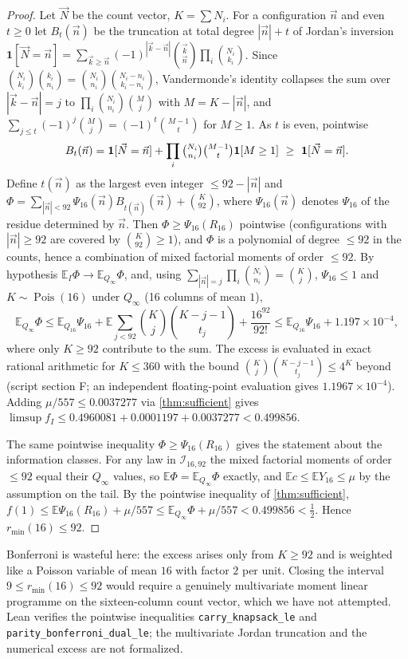 \documentclass[11pt]{article}
\DeclareMathOperator{\Pois}{Pois}
\newcommand{\Ex}{\mathbb E}
\newcommand{\Av}{\mathbb E}
\newcommand{\ind}{\mathbf 1}
\newcommand{\Qinf}{{Q_\infty}}
\begin{document}
\begin{proof}
Let $\vec N$ be the count vector, $K=\sum N_i$. For a configuration $\vec n$ and even $t\ge0$ let $B_t(\vec n)$ be the truncation at total degree $|\vec n|+t$ of Jordan's inversion $\ind[\vec N=\vec n]=\sum_{\vec k\ge\vec n}(-1)^{|\vec k-\vec n|}\binom{\vec k}{\vec n}\prod_i\binom{N_i}{k_i}$. Since $\binom{N_i}{k_i}\binom{k_i}{n_i}=\binom{N_i}{n_i}\binom{N_i-n_i}{k_i-n_i}$, Vandermonde's identity collapses the sum over $|\vec k-\vec n|=j$ to $\prod_i\binom{N_i}{n_i}\binom{M}{j}$ with $M=K-|\vec n|$, and $\sum_{j\le t}(-1)^j\binom Mj=(-1)^t\binom{M-1}t$ for $M\ge1$. As $t$ is even, pointwise
\[
B_t(\vec n)=\ind[\vec N=\vec n]+\prod_i\tbinom{N_i}{n_i}\tbinom{M-1}t\ind[M\ge1]\ \ge\ \ind[\vec N=\vec n].
\]
Define $t(\vec n)$ as the largest even integer $\le92-|\vec n|$ and $\Phi=\sum_{|\vec n|<92}\Psi_{16}(\vec n)B_{t(\vec n)}(\vec n)+\binom K{92}$, where $\Psi_{16}(\vec n)$ denotes $\Psi_{16}$ of the residue determined by $\vec n$. Then $\Phi\ge\Psi_{16}(R_{16})$ pointwise (configurations with $|\vec n|\ge92$ are covered by $\binom K{92}\ge1$), and $\Phi$ is a polynomial of degree $\le92$ in the counts, hence a combination of mixed factorial moments of order $\le92$. By hypothesis $\Av_I\Phi\to\Ex_\Qinf\Phi$, and, using $\sum_{|\vec n|=j}\prod_i\binom{N_i}{n_i}=\binom Kj$, $\Psi_{16}\le1$ and $K\sim\Pois(16)$ under $\Qinf$ (16 columns of mean $1$),
\[
\Ex_\Qinf\Phi\le\Ex_{Q_{16}}\Psi_{16}+\Ex\sum_{j<92}\binom Kj\binom{K-j-1}{t_j}+\frac{16^{92}}{92!}\le\Ex_{Q_{16}}\Psi_{16}+1.197\times10^{-4},
\]
where only $K\ge92$ contribute to the sum. The excess is evaluated in exact rational arithmetic for $K\le360$ with the bound $\binom Kj\binom{K-j-1}{t_j}\le 4^K$ beyond (script section F; an independent floating-point evaluation gives $1.1967\times10^{-4}$). Adding $\mu/557\le0.0037277$ via \cref{thm:sufficient} gives $\limsup f_I\le0.4960081+0.0001197+0.0037277<0.499856$.

The same pointwise inequality $\Phi\ge\Psi_{16}(R_{16})$ gives the statement about the information classes. For any law in $\mathcal I_{16,92}$ the mixed factorial moments of order $\le92$ equal their $\Qinf$ values, so $\Ex\Phi=\Ex_\Qinf\Phi$ exactly, and $\Ex c\le\Ex Y_{16}\le\mu$ by the assumption on the tail. By the pointwise inequality of \cref{thm:sufficient}, $f(1)\le\Ex\Psi_{16}(R_{16})+\mu/557\le\Ex_\Qinf\Phi+\mu/557<0.499856<\tfrac12$. Hence $r_{\min}(16)\le92$.
\end{proof}

\begin{remark}
Bonferroni is wasteful here: the excess arises only from $K\ge92$ and is weighted like a Poisson variable of mean $16$ with factor $2$ per unit. Closing the interval $9\le r_{\min}(16)\le92$ would require a genuinely multivariate moment linear programme on the sixteen-column count vector, which we have not attempted. Lean verifies the pointwise inequalities \texttt{carry\_knapsack\_le} and \texttt{parity\_bonferroni\_dual\_le}; the multivariate Jordan truncation and the numerical excess are not formalized.
\end{remark}
\end{document}
